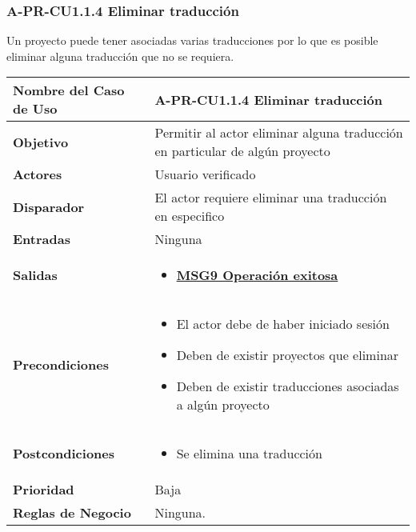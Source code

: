 \subsubsection{A-PR-CU1.1.4 Eliminar traducción}
Un proyecto puede tener asociadas varias traducciones por lo que es posible eliminar alguna traducción que no se requiera.
\begin{longtable}{|J{5cm}|J{10.3cm}|}
	\hline
	\textbf{Nombre del Caso de Uso} &
		A-PR-CU1.1.4 Eliminar traducción \\ \hline
	\textbf{Objetivo} &
		Permitir al actor eliminar alguna traducción en particular de algún proyecto \\ \hline
	\textbf{Actores} &
		Usuario verificado \\ \hline 
	\textbf{Disparador} & 
		El actor requiere eliminar una traducción en especifico \\ \hline 
	\textbf{Entradas} & 
		Ninguna \\ \hline 
	\textbf{Salidas} & 
		\begin{itemize}
		    \item \hyperref[MSG9]{\bf MSG9 Operación exitosa}
		\end{itemize} \\ \hline
	\textbf{Precondiciones} &
		\begin{itemize}
				\item El actor debe de haber iniciado sesión
				\item Deben de existir proyectos que eliminar
				\item Deben de existir traducciones asociadas a algún proyecto
		\end{itemize} \\ \hline
	\textbf{Postcondiciones} &
		\begin{itemize}
			\item Se elimina una traducción
		\end{itemize}\\ \hline
	\textbf{Prioridad} & 
		Baja \\ \hline
	\textbf{Reglas de Negocio} & 
		Ninguna. \\ \hline

\end{longtable}

